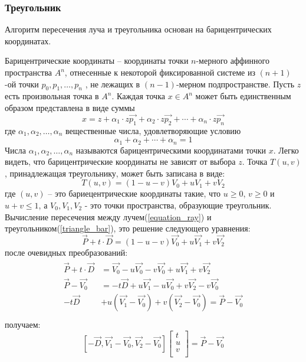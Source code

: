 \documentclass[12pt, a4paper]{article}
\begin{document}
\subsubsection{Треугольник}
Алгоритм пересечения луча и треугольника основан на барицентрических координатах.
\par
Барицентрические координаты -- координаты точки $n$-мерного аффинного пространства $A^n$, отнесенные к некоторой фиксированной системе из $(n + 1)$-ой точки $p_0, p_1, \dots, p_n$ , не лежащих в $(n -1)$-мерном подпространстве. Пусть $z$ есть произвольная точка в $A^n$. Каждая точка $x \in A^n$ может быть единственным образом представлена в виде суммы
$$
	x = z + \alpha_1 \cdot z\vec{p_1} + \alpha_2 \cdot z\vec{p_2} + \cdots + \alpha_n \cdot z\vec{p_n} 
$$
где $\alpha_1, \alpha_2, \dots,  \alpha_n $ вещественные числа, удовлетворяющие условию
$$
\alpha_1 + \alpha_2 + \cdots + \alpha_n  = 1
$$
Числа $\alpha_1, \alpha_2, \dots,  \alpha_n $ называются барицентрическими координатами точки $x$. Легко видеть, что барицентрические координаты не зависят от выбора $z$.
Точка $T(u,v)$, принадлежащая треугольнику, может быть записана в виде:
\begin{equation}
\label{triangle_bar}
T(u,v) = (1-u-v)V_0 + uV_1 + vV_2
\end{equation}
\noindent где $(u,v)$ -- это бариецентрические координаты такие, что $u \geq 0$, $v \geq 0$ и $u + v \leq 1$, а $V_0, V_1, V_2$ - это точки пространства, образующие треугольник.
Вычисление пересечения между лучем(\ref{equation_ray}) и треугольником(\ref{triangle_bar}), это решение следующего уравнения:
$$
\vec{P} + t\cdot \vec{D} = (1-u-v)\vec{V_0} + u\vec{V_1} + v\vec{V_2}
$$
после очевидных преобразований:
\begin{multline*}
\begin{split}
\vec{P} + t\cdot \vec{D} &= \vec{V_0} - u\vec{V_0} - v\vec{V_0} + u\vec{V_1} + v\vec{V_2} \\
\vec{P} - \vec{V_0} &= - t\vec{D} + u\vec{V_1} - u\vec{V_0} + v\vec{V_2} - v\vec{V_0} \\
- t\vec{D} &+ u(\vec{V_1} - \vec{V_0}) + v(\vec{V_2} - \vec{V_0}) = \vec{P} - \vec{V_0} \\
\end{split}
\end{multline*}
получаем:
\begin{equation}
\label{ray_cross_tr}
\left[ -\vec{D}, \vec{V_1} - \vec{V_0}, \vec{V_2} - \vec{V_0}\right] 
\left[  
\begin{array}{c} t \\ u \\ v \\ \end{array}
\right] = \vec{P} - \vec{V_0}
\end{equation}
\end{document}
